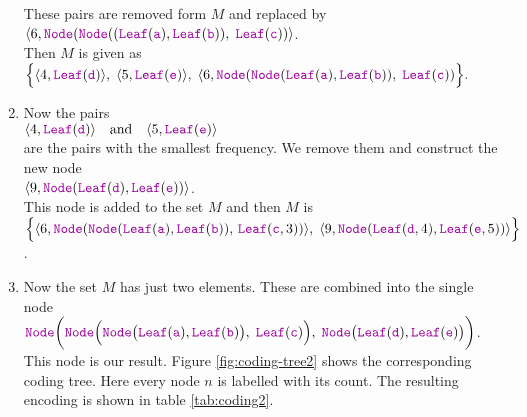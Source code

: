 \begin{enumerate}
      These pairs are removed form $M$ and replaced by 
      \\[0.2cm]
      \hspace*{0.3cm}
      $ \langle 6, \mytt{Node}(
           \mytt{Node}((\mytt{Leaf}(\mytt{a}), \mytt{Leaf}(\mytt{b})),\; 
           \mytt{Leaf}(\mytt{c}))\rangle$. 
      \\[0.2cm]
      Then $M$ is given as
      \\[0.2cm]
      \hspace*{0.3cm}
      $ \Bigl\{ 
        \langle 4, \mytt{Leaf}(\mytt{d}) \rangle,\;\langle 5, \mytt{Leaf}(\mytt{e}) \rangle,\;
        \langle 6, \mytt{Node}(
           \mytt{Node}(\mytt{Leaf}(\mytt{a}), \mytt{Leaf}(\mytt{b})),\; 
           \mytt{Leaf}(\mytt{c}))\Bigr\}. $
\item Now the pairs
      \\[0.2cm]
      \hspace*{0.3cm}
      $ \langle 4, \mytt{Leaf}(\mytt{d}) \rangle \quad \mathrm{and} \quad \langle 5, \mytt{Leaf}(\mytt{e}) \rangle$
      \\[0.2cm]
      are the pairs with the smallest frequency.
      We remove them and construct the new node \\[0.2cm]
      \hspace*{0.3cm}
      $\langle 9, \mytt{Node}(\mytt{Leaf}(\mytt{d}), \mytt{Leaf}(\mytt{e})) \rangle$.
      \\[0.2cm]
      This node is added to the set  $M$ and then $M$ is
      \\[0.2cm]
      \hspace*{0.3cm}
      $ \Bigl\{ 
        \langle 6, \mytt{Node}(
           \mytt{Node}(\mytt{Leaf}(\mytt{a}),
           \mytt{Leaf}(\mytt{b})),\,\mytt{Leaf}(\mytt{c},3))
        \rangle,\;
        \langle 9,\mytt{Node}(\mytt{Leaf}(\mytt{d},4), \mytt{Leaf}(\mytt{e},5)) \rangle
        \Bigr\}
           $.      
\item Now the set $M$ has just two elements.  These are combined into the single node 
      \\[0.2cm]
      \hspace*{0.3cm}
      $\mytt{Node}\biggl(
              \mytt{Node}\Bigl(
                 \mytt{Node}\bigl(\mytt{Leaf}(\mytt{a}), \mytt{Leaf}(\mytt{b})\bigr),\; 
                 \mytt{Leaf}(\mytt{c})\Bigr),\;
              \mytt{Node}\bigl(\mytt{Leaf}(\mytt{d}), \mytt{Leaf}(\mytt{e})\bigr)
         \biggr)
      $.
      \\[0.2cm]
      This node is our result.  Figure 
      \ref{fig:coding-tree2} shows the corresponding coding tree.  Here every node $n$ is labelled with its
      count.  The resulting encoding is shown in table  \ref{tab:coding2}.
\end{enumerate}

